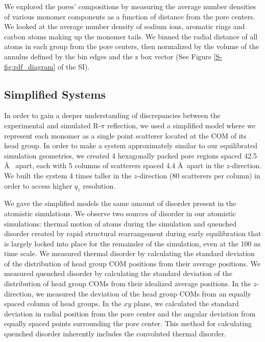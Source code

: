 \documentclass[journal=jpcbfk,manuscript=article]{achemso}
\begin{document}
  We explored the pores' compositions by measuring the average number densities
  of various monomer components as a function of distance from the pore centers.
  We looked at the average number density of sodium ions, aromatic rings and 
  carbon atoms making up the monomer tails. We binned the radial distance of all
  atoms in each group from the pore centers, then normalized by the volume of the
  annulus defined by the bin edges and the z box vector (See Figure \ref{S-fig:rdf_diagram}
  of the SI). 

  \subsection{Simplified Systems}\label{method:simple_systems}
  
  In order to gain a deeper understanding of discrepancies between the
  experimental and simulated R-$\pi$ reflection, we used a simplified model where
  we represent each monomer as a single point scatterer located at the COM of its
  head group. In order to make a system approximately similar to our equilibrated
  simulation geometries, we created 4 hexagonally packed pore regions spaced 42.5
  \AA~ apart, each with 5 columns of scatterers spaced 4.4 \AA~apart in the
  $z$-direction. We built the system 4 times taller in the $z$-direction (80
  scatterers per column) in order to access higher $q_z$ resolution.
  
  We gave the simplified models the same amount of disorder present in the
  atomistic simulations. We observe two sources of disorder in our atomistic
  simulations: thermal motion of atoms during the simulation and quenched
  disorder created by rapid structural rearrangement during early equilibration
  that is largely locked into place for the remainder of the simulation, even at
  the 100 ns time scale. We measured thermal disorder by calculating the standard
  deviation of the distribution of head group COM positions from their average
  positions. We measured quenched disorder by calculating the standard deviation
  of the distribution of head group COMs from their idealized average positions.
  In the $z$-direction, we measured the deviation of the head group COMs from an
  equally spaced column of head groups. In the $xy$ plane, we calculated the
  standard deviation in radial position from the pore center and the angular
  deviation from equally spaced points surrounding the pore center. This method
  for calculating quenched disorder inherently includes the convoluted thermal
  disorder. 
  
\end{document}
